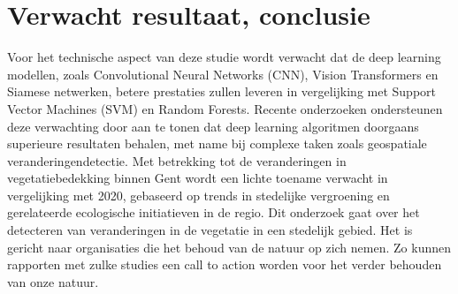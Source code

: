 \section{Verwacht resultaat, conclusie}%
\label{sec:verwachte_resultaten}




Voor het technische aspect van deze studie wordt verwacht dat de deep learning modellen, zoals Convolutional Neural Networks (CNN), 
Vision Transformers en Siamese netwerken, betere prestaties zullen leveren in vergelijking met Support Vector Machines (SVM) en 
Random Forests. Recente onderzoeken ondersteunen deze verwachting door aan te tonen dat deep learning algoritmen doorgaans 
superieure resultaten behalen, met name bij complexe taken zoals geospatiale veranderingendetectie.
\newline
Met betrekking tot de veranderingen in vegetatiebedekking binnen Gent wordt een lichte toename verwacht in vergelijking met 2020, 
gebaseerd op trends in stedelijke vergroening en gerelateerde ecologische initiatieven in de regio.
\newline
Dit onderzoek gaat over het detecteren van veranderingen in de vegetatie in een stedelijk gebied. Het is gericht naar organisaties 
die het behoud van de natuur op zich nemen. Zo kunnen rapporten met zulke studies een call to action worden voor het verder 
behouden van onze natuur.